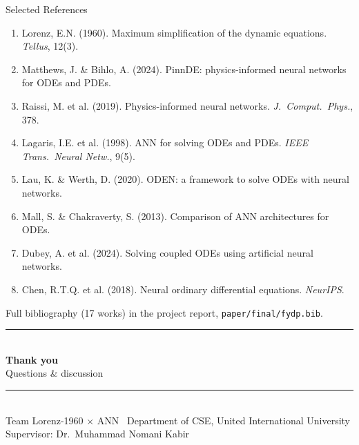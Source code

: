 \documentclass[aspectratio=169,11pt]{beamer}
\begin{document}
\begin{frame}{Selected References}
  \footnotesize
  \begin{enumerate}
    \item Lorenz, E.N. (1960). Maximum simplification of the dynamic equations. \textit{Tellus}, 12(3).
    \item Matthews, J. \& Bihlo, A. (2024). PinnDE: physics-informed neural networks for ODEs and PDEs.
    \item Raissi, M. et al. (2019). Physics-informed neural networks. \textit{J.\ Comput.\ Phys.}, 378.
    \item Lagaris, I.E. et al. (1998). ANN for solving ODEs and PDEs. \textit{IEEE Trans.\ Neural Netw.}, 9(5).
    \item Lau, K. \& Werth, D. (2020). ODEN: a framework to solve ODEs with neural networks.
    \item Mall, S. \& Chakraverty, S. (2013). Comparison of ANN architectures for ODEs.
    \item Dubey, A. et al. (2024). Solving coupled ODEs using artificial neural networks.
    \item Chen, R.T.Q. et al. (2018). Neural ordinary differential equations. \textit{NeurIPS}.
  \end{enumerate}
  \vspace{0.1cm}
  {\scriptsize Full bibliography (17 works) in the project report, \texttt{paper/final/fydp.bib}.}
\end{frame}

{
\begin{frame}[plain]
  \centering
  \vspace{1.1cm}
  {\color{tealDark}\rule{0.7\textwidth}{1.0pt}}\\[0.4cm]
  {\Huge\bfseries Thank you}\\[0.3cm]
  {\Large Questions \& discussion}\\[0.5cm]
  {\color{tealDark}\rule{0.7\textwidth}{1.0pt}}\\[0.6cm]
  {\footnotesize Team Lorenz-1960 $\times$ ANN \textbullet\ Department of CSE, United International University}\\[2pt]
  {\footnotesize Supervisor: Dr.\ Muhammad Nomani Kabir}
\end{frame}
}
\end{document}
